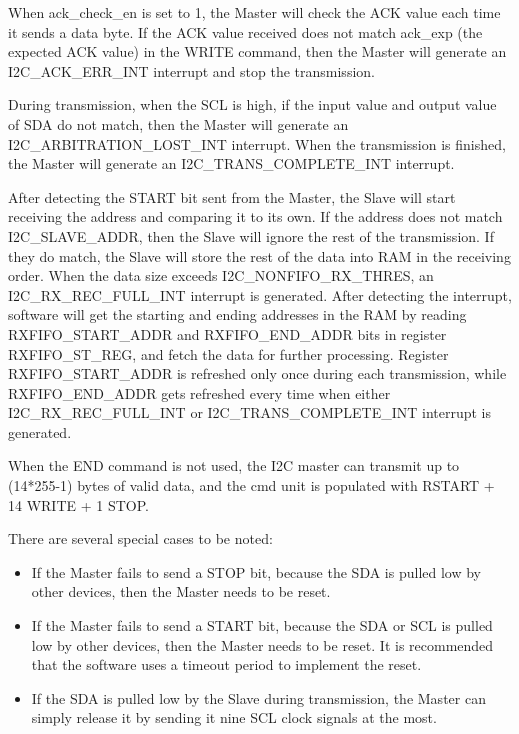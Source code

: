 \documentclass[main\_\_EN.tex]{subfiles}
\begin{document}
When ack\_check\_en is set to 1, the Master will check the ACK value each time it sends a data byte. If the ACK value received does not match ack\_exp (the expected ACK value) in the WRITE command, then the Master will generate an I2C\_ACK\_ERR\_INT interrupt and stop the transmission.

During transmission, when the SCL is high, if the input value and output value of SDA do not match, then the Master will generate an I2C\_ARBITRATION\_LOST\_INT interrupt. When the transmission is finished, the Master will generate an I2C\_TRANS\_COMPLETE\_INT interrupt.

After detecting the START bit sent from the Master, the Slave will start receiving the address and comparing it to its own. If the address does not match I2C\_SLAVE\_ADDR, then the Slave will ignore the rest of the transmission. If they do match, the Slave will store the rest of the data into RAM in the receiving order. When the data size exceeds I2C\_NONFIFO\_RX\_THRES, an I2C\_RX\_REC\_FULL\_INT interrupt is generated. After detecting the interrupt, software will get the starting and ending addresses in the RAM by reading RXFIFO\_START\_ADDR and RXFIFO\_END\_ADDR bits in register RXFIFO\_ST\_REG, and fetch the data for further processing. Register RXFIFO\_START\_ADDR is refreshed only once during each transmission, while RXFIFO\_END\_ADDR gets refreshed every time when either I2C\_RX\_REC\_FULL\_INT or I2C\_TRANS\_COMPLETE\_INT interrupt is generated.

When the END command is not used, the I2C master can transmit up to (14*255-1) bytes of valid data, and the cmd unit is populated with RSTART + 14 WRITE + 1 STOP.

There are several special cases to be noted:

\begin{itemize}
    \item If the Master fails to send a STOP bit, because the SDA is pulled low by other devices, then the Master needs to be reset.
    \item If the Master fails to send a START bit, because the SDA or SCL is pulled low by other devices, then the Master needs to be reset. It is recommended that the software uses a timeout period to implement the reset.
    \item If the SDA is pulled low by the Slave during transmission, the Master can simply release it by sending it nine SCL clock signals at the most.
\end{itemize}
\end{document}
